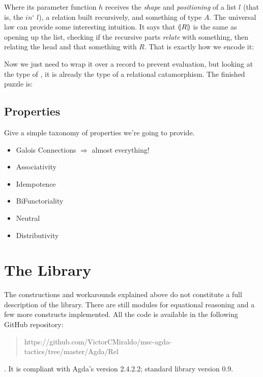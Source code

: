 Where its parameter function $h$ receives the \emph{shape} and \emph{positioning} of a list $l$
(that is, the $in^\circ\;l$), a relation built recursively, and something of type $A$.
The universal law can provide some interesting intuition. It says that $\mathopen{(\!|}R\mathclose{|\!)}$ is
the same as opening up the list, checking if the recursive parts \emph{relate} with something,
then relating the head and that something with $R$. That is exactly how we encode it:


Now we just need to wrap it over a record to prevent evaluation, but looking at the type
of , it is already the type of a relational catamorphism. The finished puzzle is:




\subsection{Properties}

\begin{TODO}
  \item Give a simple taxonomy of properties we're going to provide.
        \begin{itemize}
            \item Galois Connections $\Rightarrow$ almost everything!
            \item Associativity
            \item Idempotence
            \item BiFunctoriality
            \item Neutral
            \item Distributivity
         \end{itemize}
\end{TODO}

\section{The Library}

The constructions and workarounds explained above do not constitute a full description of the library.
There are still modules for equational reasoning and a few more constructs implemented.
All the code is available in the following GitHub repository: 
\begin{quote}
\small https://github.com/VictorCMiraldo/msc-agda-tactics/tree/master/Agda/Rel
\end{quote}. It is compliant with Agda's version 2.4.2.2; standard library version 0.9.

